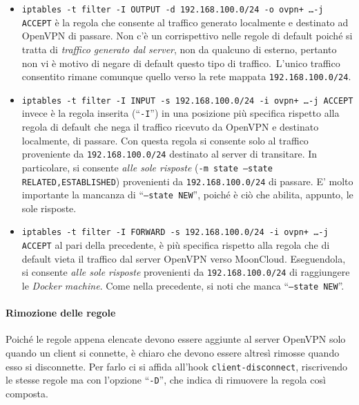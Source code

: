 		\begin{itemize}
			\item \texttt{iptables -t filter -I OUTPUT -d 192.168.100.0/24 -o ovpn+ \ldots -j ACCEPT}
			      è la regola che consente al traffico generato localmente e destinato ad OpenVPN
			      di passare. Non c'è un corrispettivo nelle regole di default poiché si tratta di
			      \textit{traffico generato dal server}, non da qualcuno di esterno, pertanto
			      non vi è motivo di negare di default questo tipo di traffico.\
			      L'unico traffico consentito rimane comunque quello verso la rete mappata
			      \texttt{192.168.100.0/24}.
			\item \texttt{iptables -t filter -I INPUT -s 192.168.100.0/24 -i ovpn+ \ldots -j ACCEPT}
			      invece è la regola inserita (``\texttt{-I}'') in una posizione più specifica rispetto
			      alla regola di default
			      che nega il traffico ricevuto da OpenVPN e destinato localmente, di passare.
			      Con questa regola si consente solo al traffico proveniente da \texttt{192.168.100.0/24}
			      destinato al server di transitare. In particolare, si consente \textit{alle sole risposte}
			      (\texttt{-m state --state RELATED,ESTABLISHED})
			      provenienti da \texttt{192.168.100.0/24}
			      di passare. E' molto importante la mancanza di ``\texttt{--state NEW}'',
			      poiché è ciò che abilita, appunto, le sole risposte.
			\item \texttt{iptables -t filter -I FORWARD -s 192.168.100.0/24 -i ovpn+ \ldots -j ACCEPT}
			      al pari della precedente, è più specifica rispetto alla regola che di default vieta il traffico
			      dal server OpenVPN verso MoonCloud.
			      Eseguendola, si consente \textit{alle sole risposte}
			      provenienti da \texttt{192.168.100.0/24}
			      di raggiungere le \textit{Docker machine}. Come nella precedente, si noti che manca
			      ``\texttt{--state NEW}''.
		\end{itemize}
				
				
		\paragraph{Rimozione delle regole}
		Poiché le regole appena elencate devono essere aggiunte al server OpenVPN solo quando
		un client si connette, è chiaro che devono essere altresì rimosse quando esso si disconnette.
		Per farlo ci si affida all'hook \texttt{client-disconnect}, riscrivendo
		le stesse regole ma con l'opzione ``\texttt{-D}'', che indica di rimuovere la regola così
		composta.
				
